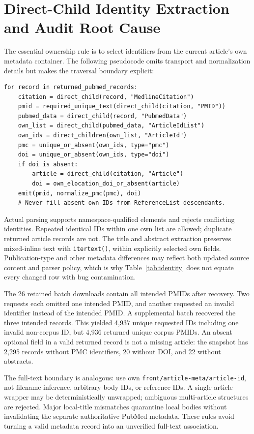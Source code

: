 \section{Direct-Child Identity Extraction and Audit Root Cause}
\label{app:parser}
The essential ownership rule is to select identifiers from the current article's own metadata container. The following pseudocode omits transport and normalization details but makes the traversal boundary explicit:
\begin{verbatim}
for record in returned_pubmed_records:
    citation = direct_child(record, "MedlineCitation")
    pmid = required_unique_text(direct_child(citation, "PMID"))
    pubmed_data = direct_child(record, "PubmedData")
    own_list = direct_child(pubmed_data, "ArticleIdList")
    own_ids = direct_children(own_list, "ArticleId")
    pmc = unique_or_absent(own_ids, type="pmc")
    doi = unique_or_absent(own_ids, type="doi")
    if doi is absent:
        article = direct_child(citation, "Article")
        doi = own_elocation_doi_or_absent(article)
    emit(pmid, normalize_pmc(pmc), doi)
    # Never fill absent own IDs from ReferenceList descendants.
\end{verbatim}
Actual parsing supports namespace-qualified elements and rejects conflicting identities. Repeated identical IDs within one own list are allowed; duplicate returned article records are not. The title and abstract extraction preserves mixed-inline text with \texttt{itertext()}, within explicitly selected own fields. Publication-type and other metadata differences may reflect both updated source content and parser policy, which is why Table~\ref{tab:identity} does not equate every changed row with bug contamination.

The 26 retained batch downloads contain all intended PMIDs after recovery. Two requests each omitted one intended PMID, and another requested an invalid identifier instead of the intended PMID. A supplemental batch recovered the three intended records. This yielded 4,937 unique requested IDs including one invalid non-corpus ID, but 4,936 returned unique corpus PMIDs. An absent optional field in a valid returned record is not a missing article: the snapshot has 2,295 records without PMC identifiers, 20 without DOI, and 22 without abstracts.

The full-text boundary is analogous: use own \texttt{front/article-meta/article-id}, not filename inference, arbitrary body IDs, or reference IDs. A single-article wrapper may be deterministically unwrapped; ambiguous multi-article structures are rejected. Major local-title mismatches quarantine local bodies without invalidating the separate authoritative PubMed metadata. These rules avoid turning a valid metadata record into an unverified full-text association.

